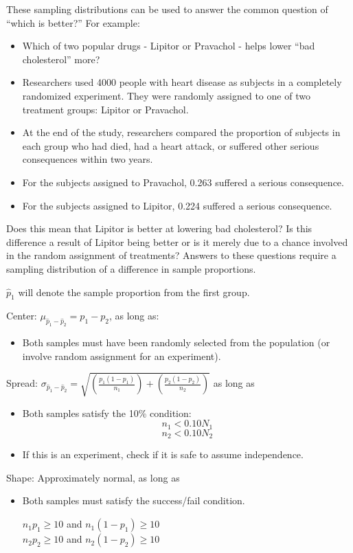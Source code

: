 \documentclass[../stats.tex]{subfiles}
\begin{document}
These sampling distributions can be used to answer the common question of ``which is better?'' For example:
\begin{itemize}
    \item Which of two popular drugs - Lipitor or Pravachol - helps lower ``bad cholesterol'' more?
    \item Researchers used 4000 people with heart disease as subjects in a completely randomized experiment. They were randomly assigned to one of two treatment groups: Lipitor or Pravachol.
    \item At the end of the study, researchers compared the proportion of subjects in each group who had died, had a heart attack, or suffered other serious consequences within two years.
    \item For the subjects assigned to Pravachol, 0.263 suffered a serious consequence.
    \item For the subjects assigned to Lipitor, 0.224 suffered a serious consequence.
\end{itemize}

Does this mean that Lipitor is better at lowering bad cholesterol? Is this difference a result of Lipitor being better or is it merely due to a chance involved in the random assignment of treatments? Answers to these questions require a sampling distribution of a difference in sample proportions.

$\hat{p}_1$ will denote the sample proportion from the first group.

Center: $\mu_{\hat{p}_1-\hat{p}_2}=p_1-p_2$, as long as:
\begin{itemize}
    \item Both samples must have been randomly selected from the population (or involve random assignment for an experiment).
\end{itemize}

Spread: $\sigma_{\hat{p}_1-\hat{p}_2}=\sqrt{\left(\frac{p_1(1-p_1)}{n_1}\right) + \left( \frac{p_2(1-p_2)}{n_2}\right)}$ as long as 
\begin{itemize}
    \item Both samples satisfy the 10\% condition: 
    \[ n_1<0.10N_1 \]
    \[ n_2 < 0.10 N_2 \]
    \item If this is an experiment, check if it is safe to assume independence.
\end{itemize}

Shape: Approximately normal, as long as 
\begin{itemize}
    \item Both samples must satisfy the success/fail condition.
    \begin{center}
        $n_1p_1\geq 10$ and $n_1(1-p_1)\geq 10$ \\
        $n_2p_2\geq 10$ and $n_2(1-p_2)\geq 10$
    \end{center}
\end{itemize}
\end{document}
